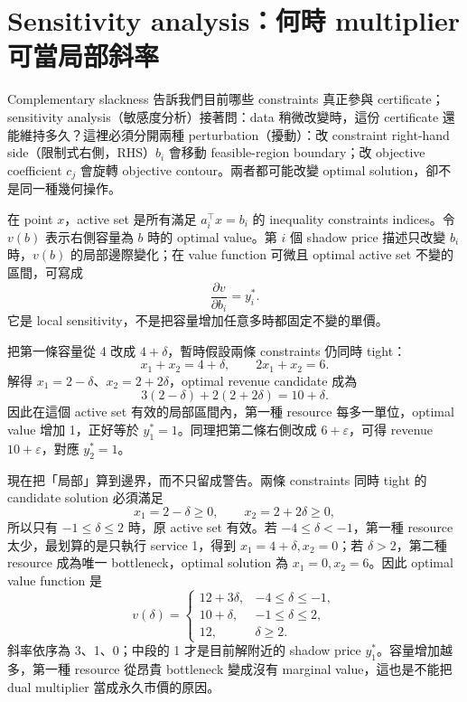 \documentclass[11pt,a4paper,oneside,openany]{book}
\begin{document}
\section{Sensitivity analysis：何時 multiplier 可當局部斜率}
Complementary slackness 告訴我們目前哪些 constraints 真正參與 certificate；sensitivity analysis（敏感度分析）接著問：data 稍微改變時，這份 certificate 還能維持多久？這裡必須分開兩種 perturbation（擾動）：改 constraint right-hand side（限制式右側，RHS）$b_i$ 會移動 feasible-region boundary；改 objective coefficient $c_j$ 會旋轉 objective contour。兩者都可能改變 optimal solution，卻不是同一種幾何操作。

\begin{definition}
在 point $x$，active set 是所有滿足 $a_i^\top x=b_i$ 的 inequality constraints indices。令 $v(b)$ 表示右側容量為 $b$ 時的 optimal value。第 $i$ 個 shadow price 描述只改變 $b_i$ 時，$v(b)$ 的局部邊際變化；在 value function 可微且 optimal active set 不變的區間，可寫成
\[
 \frac{\partial v}{\partial b_i}=y_i^*.
\]
它是 local sensitivity，不是把容量增加任意多時都固定不變的單價。
\end{definition}

\begin{example}
把第一條容量從 4 改成 $4+\delta$，暫時假設兩條 constraints 仍同時 tight：
\[
 x_1+x_2=4+\delta,\qquad 2x_1+x_2=6.
\]
解得 $x_1=2-\delta$、$x_2=2+2\delta$，optimal revenue candidate 成為
\[
 3(2-\delta)+2(2+2\delta)=10+\delta.
\]
因此在這個 active set 有效的局部區間內，第一種 resource 每多一單位，optimal value 增加 1，正好等於 $y_1^*=1$。同理把第二條右側改成 $6+\varepsilon$，可得 revenue $10+\varepsilon$，對應 $y_2^*=1$。

現在把「局部」算到邊界，而不只留成警告。兩條 constraints 同時 tight 的 candidate solution 必須滿足
\[
 x_1=2-\delta\ge0,
 \qquad
 x_2=2+2\delta\ge0,
\]
所以只有 $-1\le\delta\le2$ 時，原 active set 有效。若 $-4\le\delta<-1$，第一種 resource 太少，最划算的是只執行 service 1，得到 $x_1=4+\delta,x_2=0$；若 $\delta>2$，第二種 resource 成為唯一 bottleneck，optimal solution 為 $x_1=0,x_2=6$。因此 optimal value function 是
\[
 v(\delta)=
 \begin{cases}
 12+3\delta, & -4\le\delta\le-1,\\
 10+\delta, & -1\le\delta\le2,\\
 12, & \delta\ge2.
 \end{cases}
\]
斜率依序為 3、1、0；中段的 1 才是目前解附近的 shadow price $y_1^*$。容量增加越多，第一種 resource 從昂貴 bottleneck 變成沒有 marginal value，這也是不能把 dual multiplier 當成永久市價的原因。
\end{example}
\end{document}
